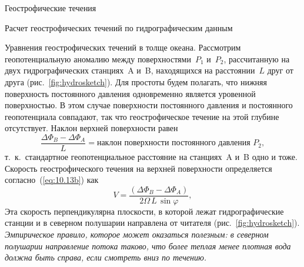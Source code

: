 \begin{chapter}{Геострофические течения}
\begin{section}{Расчет геострофических течений по гидрографическим данным}
\begin{paragraph}{Уравнения геострофических течений в толще океана.}
Рассмотрим геопотенциальную аномалию между поверхностями~$P_1$ и~$P_2$,
рассчитанную на двух гидрографических станциях~A и~B, находящихся на 
расстоянии~$L$ друг от друга (рис.~\ref{fig:hydrosketch}). 
Для простоты будем полагать, что нижняя поверхность постоянного
давления одновременно является уровенной 
поверхностью. В этом случае поверхности 
постоянного давления и постоянного геопотенциала совпадают, так что 
геострофическое течение на этой глубине отсутствует.
Наклон верхней поверхности равен
\begin{displaymath}
 \frac{\Delta\Phi_B - \Delta\Phi_A}{L} 
  =\text{наклон поверхности постоянного давления $P_2$},
\end{displaymath}
т.~к.\ стандартное геопотенциальное расстояние на станциях~A и~B одно и тоже.
Скорость геострофического течения на 
верхней поверхности определяется согласно~(\ref{eq:10.13b}) как
\begin{equation}
  V =\frac{\left(\Delta\Phi_B - \Delta\Phi_A\right)}{2\Omega\,L\, \sin\varphi},
\end{equation}
Эта скорость перпендикулярна плоскости, в которой лежат гидрографические 
станции и в северном полушарии направлена от читателя (рис.~\ref{fig:hydrosketch}). 
\emph{Эмпирическое правило, которое может оказаться полезным:
в северном полушарии направление потока таково, что более теплая менее плотная
вода должна быть справа, если смотреть вниз по течению.}
%

\end{paragraph}
\end{section}
\end{chapter}
